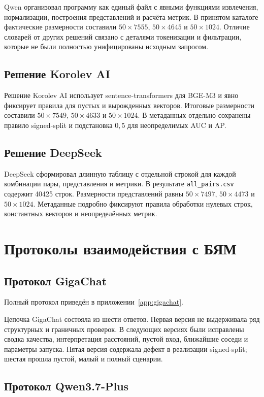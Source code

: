 \documentclass[a4paper,12pt]{extreport}
\newcommand{\code}[1]{\nolinkurl{#1}}
\begin{document}
Qwen организовал программу как единый файл с явными функциями извлечения, нормализации, построения представлений и расчёта метрик. В принятом каталоге фактические размерности составили $50\times7555$, $50\times4645$ и $50\times1024$. Отличие словарей от других решений связано с деталями токенизации и фильтрации, которые не были полностью унифицированы исходным запросом.

\subsection{Решение Korolev AI}

Решение Korolev AI использует sentence-transformers для BGE-M3 и явно фиксирует правила для пустых и вырожденных векторов. Итоговые размерности составили $50\times7549$, $50\times4633$ и $50\times1024$. В метаданных отдельно сохранены правило signed-split и подстановка $0{,}5$ для неопределимых AUC и AP.

\subsection{Решение DeepSeek}

DeepSeek сформировал длинную таблицу с отдельной строкой для каждой комбинации пары, представления и метрики. В результате \code{all_pairs.csv} содержит 40425 строк. Размерности представлений равны $50\times7497$, $50\times4473$ и $50\times1024$. Метаданные подробно фиксируют правила обработки нулевых строк, константных векторов и неопределённых метрик.

\section{Протоколы взаимодействия с БЯМ}

\subsection{Протокол GigaChat}

Полный протокол приведён в приложении~\ref{app:gigachat}.

Цепочка GigaChat состояла из шести ответов. Первая версия не выдерживала ряд структурных и граничных проверок. В следующих версиях были исправлены сводка качества, интерпретация расстояний, пустой вход, ближайшие соседи и параметры запуска. Пятая версия содержала дефект в реализации signed-split; шестая прошла пустой, малый и полный сценарии.

\subsection{Протокол Qwen3.7-Plus}
\end{document}
